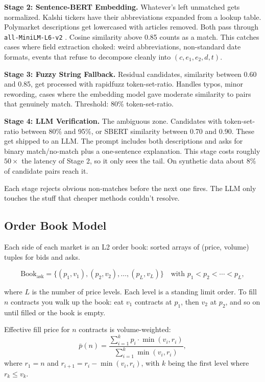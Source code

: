 \documentclass[11pt]{article}
\theoremstyle{definition}
\theoremstyle{remark}
\begin{document}
\textbf{Stage 2: Sentence-BERT Embedding.} Whatever's left unmatched gets normalized. Kalshi tickers have their abbreviations expanded from a lookup table. Polymarket descriptions get lowercased with articles removed. Both pass through \texttt{all-MiniLM-L6-v2} \citep{reimers2019sentence}. Cosine similarity above 0.85 counts as a match. This catches cases where field extraction choked: weird abbreviations, non-standard date formats, events that refuse to decompose cleanly into $(c, e_1, e_2, d, t)$.

\textbf{Stage 3: Fuzzy String Fallback.} Residual candidates, similarity between 0.60 and 0.85, get processed with rapidfuzz \citep{bachmann2021rapidfuzz} token-set-ratio. Handles typos, minor rewording, cases where the embedding model gave moderate similarity to pairs that genuinely match. Threshold: 80\% token-set-ratio.

\textbf{Stage 4: LLM Verification.} The ambiguous zone. Candidates with token-set-ratio between 80\% and 95\%, or SBERT similarity between 0.70 and 0.90. These get shipped to an LLM. The prompt includes both descriptions and asks for binary match/no-match plus a one-sentence explanation. This stage costs roughly $50\times$ the latency of Stage 2, so it only sees the tail. On synthetic data about 8\% of candidate pairs reach it.

Each stage rejects obvious non-matches before the next one fires. The LLM only touches the stuff that cheaper methods couldn't resolve.

\subsection{Order Book Model}
\label{sec:orderbook}

Each side of each market is an L2 order book: sorted arrays of (price, volume) tuples for bids and asks.

\begin{equation}
\text{Book}_{\text{ask}} = \{(p_1, v_1), (p_2, v_2), \ldots, (p_L, v_L)\} \quad \text{with } p_1 < p_2 < \cdots < p_L,
\end{equation}

where $L$ is the number of price levels. Each level is a standing limit order. To fill $n$ contracts you walk up the book: eat $v_1$ contracts at $p_1$, then $v_2$ at $p_2$, and so on until filled or the book is empty.

Effective fill price for $n$ contracts is volume-weighted:
\begin{equation}
\label{eq:vwap}
\bar{p}(n) = \frac{\sum_{i=1}^{k} p_i \cdot \min(v_i, r_i)}{\sum_{i=1}^{k} \min(v_i, r_i)},
\end{equation}
where $r_1 = n$ and $r_{i+1} = r_i - \min(v_i, r_i)$, with $k$ being the first level where $r_k \leq v_k$.
\end{document}
